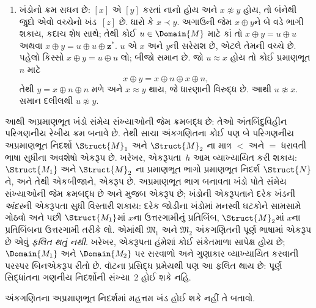 \begin{enumerate}
\item ખંડોનો ક્રમ
  સઘન છે: $[x]$
  એ $[y]$ કરતાં
  નાનો હોય અને
  $x \not\approx y$
  હોય, તો બંનેથી
  જુદો એવો વચ્ચેનો
  ખંડ~$[z]$ છે.
  ધારો કે $x \prec
  y$. અગાઉની જેમ
  $x \oplus y$ને
  બે વડે ભાગી
  શકાય, કદાચ
  શેષ સાથે;
  તેથી કોઈ $u
  \in \Domain{M}$
  માટે કાં તો
  $x \oplus y =
  u \oplus u$
  અથવા $x \oplus
  y = u \oplus u
  \oplus \mathbf{z}^*$.
  $u$ એ $x$
  અને $y$ની
  સરેરાશ છે,
  એટલે તેમની
  વચ્ચે છે. પહેલો
  કિસ્સો $x \oplus
  y = u \oplus u$
  લો; બીજો
  સમાન છે. જો
  $u \approx x$
  હોય તો કોઈ
  પ્રમાણભૂત $n$
  માટે
  \[
  x \oplus y = x \oplus n \oplus x \oplus n,
  \]
  તેથી $y = x
  \oplus n \oplus n$
  મળે અને
  $x \approx y$
  થાય, જે
  ધારણાની વિરુદ્ધ
  છે. આથી
  $u \not\approx x$.
  સમાન દલીલથી
  $u \not\approx y$.
\end{enumerate}
આથી અપ્રમાણભૂત
ખંડો સંમેય
સંખ્યાઓની જેમ
ક્રમબદ્ધ છે:
તેઓ અંતબિંદુવિહીન
પરિગણનીય
રેખીય ક્રમ બનાવે
છે. તેથી સાચા
અંકગણિતના
કોઈ પણ બે
પરિગણનીય
અપ્રમાણભૂત
નિદર્શો
$\Struct{M}_1$
અને $\Struct{M}_2$
ના માત્ર $<$
અને $=$ ધરાવતી
ભાષા સુધીના
અવશેષો એકરૂપ
છે. ખરેખર,
એકરૂપતા~$h$
આમ વ્યાખ્યાયિત
કરી શકાય:
$\Struct{M_1}$
અને $\Struct{M}_2$
ના પ્રમાણભૂત
ભાગો પ્રમાણભૂત
નિદર્શ
$\Struct{N}$ને,
અને તેથી
એકબીજાને,
એકરૂપ છે.
અપ્રમાણભૂત
ભાગ બનાવતા
ખંડો પોતે
સંમેય સંખ્યાઓની
જેમ ક્રમબદ્ધ
છે અને
મુજબ એકરૂપ
છે; ખંડોની
એકરૂપતાને
દરેક ખંડની
\emph{અંદર}ની
એકરૂપતા સુધી
વિસ્તારી શકાય:
દરેક જોડીના
ખંડોમાં મનસ્વી
ઘટકોને સામસામે
ગોઠવો અને પછી
$\Struct{M_1}$માં
$x$ના ઉત્તરગામીનું
પ્રતિબિંબ,
$\Struct{M}_2$માં
$x$ના પ્રતિબિંબના
ઉત્તરગામી તરીકે
લો. એમાંથી
$\mathfrak{M}_1$
અને $\mathfrak{M}_2$
અંકગણિતની પૂર્ણ
ભાષામાં એકરૂપ
છે એવું
\emph{ફલિત થતું નથી}.
ખરેખર, એકરૂપતા
હંમેશાં કોઈ
સંકેતમાળા સાપેક્ષ
હોય છે; $\Domain{M_1}$
અને $\Domain{M_2}$
પર સરવાળો અને
ગુણાકાર વ્યાખ્યાયિત
કરવાની પરસ્પર
બિનએકરૂપ રીતો
છે. વૉટના
પ્રસિદ્ધ પ્રમેયથી
પણ આ ફલિત
થાય છે: પૂર્ણ
સિદ્ધાંતના
ગણનીય નિદર્શોની
સંખ્યા~2
હોઈ શકે નહિ.


\begin{prob}
અંકગણિતના અપ્રમાણભૂત નિદર્શમાં
મહત્તમ ખંડ હોઈ શકે નહીં તે બતાવો.
\end{prob}


